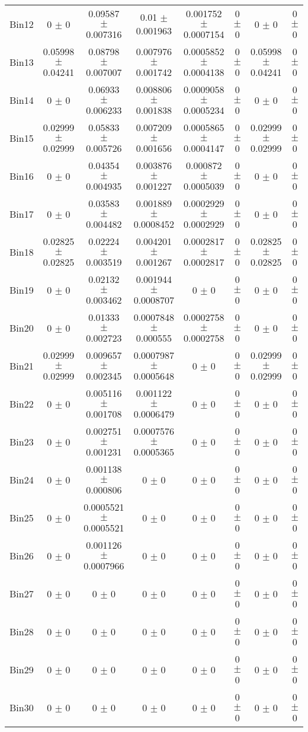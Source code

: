 \begin{tabular}{@{\extracolsep{4pt}}lccccccc@{}}
     Bin12 & 0 $\pm$ 0 & 0.09587 $\pm$ 0.007316 & 0.01 $\pm$ 0.001963 & 0.001752 $\pm$ 0.0007154 & 0 $\pm$ 0 & 0 $\pm$ 0 & 0 $\pm$ 0 \\ 
     Bin13 & 0.05998 $\pm$ 0.04241 & 0.08798 $\pm$ 0.007007 & 0.007976 $\pm$ 0.001742 & 0.0005852 $\pm$ 0.0004138 & 0 $\pm$ 0 & 0.05998 $\pm$ 0.04241 & 0 $\pm$ 0 \\ 
     Bin14 & 0 $\pm$ 0 & 0.06933 $\pm$ 0.006233 & 0.008806 $\pm$ 0.001838 & 0.0009058 $\pm$ 0.0005234 & 0 $\pm$ 0 & 0 $\pm$ 0 & 0 $\pm$ 0 \\ 
     Bin15 & 0.02999 $\pm$ 0.02999 & 0.05833 $\pm$ 0.005726 & 0.007209 $\pm$ 0.001656 & 0.0005865 $\pm$ 0.0004147 & 0 $\pm$ 0 & 0.02999 $\pm$ 0.02999 & 0 $\pm$ 0 \\ 
     Bin16 & 0 $\pm$ 0 & 0.04354 $\pm$ 0.004935 & 0.003876 $\pm$ 0.001227 & 0.000872 $\pm$ 0.0005039 & 0 $\pm$ 0 & 0 $\pm$ 0 & 0 $\pm$ 0 \\ 
     Bin17 & 0 $\pm$ 0 & 0.03583 $\pm$ 0.004482 & 0.001889 $\pm$ 0.0008452 & 0.0002929 $\pm$ 0.0002929 & 0 $\pm$ 0 & 0 $\pm$ 0 & 0 $\pm$ 0 \\ 
     Bin18 & 0.02825 $\pm$ 0.02825 & 0.02224 $\pm$ 0.003519 & 0.004201 $\pm$ 0.001267 & 0.0002817 $\pm$ 0.0002817 & 0 $\pm$ 0 & 0.02825 $\pm$ 0.02825 & 0 $\pm$ 0 \\ 
     Bin19 & 0 $\pm$ 0 & 0.02132 $\pm$ 0.003462 & 0.001944 $\pm$ 0.0008707 & 0 $\pm$ 0 & 0 $\pm$ 0 & 0 $\pm$ 0 & 0 $\pm$ 0 \\ 
     Bin20 & 0 $\pm$ 0 & 0.01333 $\pm$ 0.002723 & 0.0007848 $\pm$ 0.000555 & 0.0002758 $\pm$ 0.0002758 & 0 $\pm$ 0 & 0 $\pm$ 0 & 0 $\pm$ 0 \\ 
     Bin21 & 0.02999 $\pm$ 0.02999 & 0.009657 $\pm$ 0.002345 & 0.0007987 $\pm$ 0.0005648 & 0 $\pm$ 0 & 0 $\pm$ 0 & 0.02999 $\pm$ 0.02999 & 0 $\pm$ 0 \\ 
     Bin22 & 0 $\pm$ 0 & 0.005116 $\pm$ 0.001708 & 0.001122 $\pm$ 0.0006479 & 0 $\pm$ 0 & 0 $\pm$ 0 & 0 $\pm$ 0 & 0 $\pm$ 0 \\ 
     Bin23 & 0 $\pm$ 0 & 0.002751 $\pm$ 0.001231 & 0.0007576 $\pm$ 0.0005365 & 0 $\pm$ 0 & 0 $\pm$ 0 & 0 $\pm$ 0 & 0 $\pm$ 0 \\ 
     Bin24 & 0 $\pm$ 0 & 0.001138 $\pm$ 0.000806 & 0 $\pm$ 0 & 0 $\pm$ 0 & 0 $\pm$ 0 & 0 $\pm$ 0 & 0 $\pm$ 0 \\ 
     Bin25 & 0 $\pm$ 0 & 0.0005521 $\pm$ 0.0005521 & 0 $\pm$ 0 & 0 $\pm$ 0 & 0 $\pm$ 0 & 0 $\pm$ 0 & 0 $\pm$ 0 \\ 
     Bin26 & 0 $\pm$ 0 & 0.001126 $\pm$ 0.0007966 & 0 $\pm$ 0 & 0 $\pm$ 0 & 0 $\pm$ 0 & 0 $\pm$ 0 & 0 $\pm$ 0 \\ 
     Bin27 & 0 $\pm$ 0 & 0 $\pm$ 0 & 0 $\pm$ 0 & 0 $\pm$ 0 & 0 $\pm$ 0 & 0 $\pm$ 0 & 0 $\pm$ 0 \\ 
     Bin28 & 0 $\pm$ 0 & 0 $\pm$ 0 & 0 $\pm$ 0 & 0 $\pm$ 0 & 0 $\pm$ 0 & 0 $\pm$ 0 & 0 $\pm$ 0 \\ 
     Bin29 & 0 $\pm$ 0 & 0 $\pm$ 0 & 0 $\pm$ 0 & 0 $\pm$ 0 & 0 $\pm$ 0 & 0 $\pm$ 0 & 0 $\pm$ 0 \\ 
     Bin30 & 0 $\pm$ 0 & 0 $\pm$ 0 & 0 $\pm$ 0 & 0 $\pm$ 0 & 0 $\pm$ 0 & 0 $\pm$ 0 & 0 $\pm$ 0 \\ 
\hline\hline
  \end{tabular}
